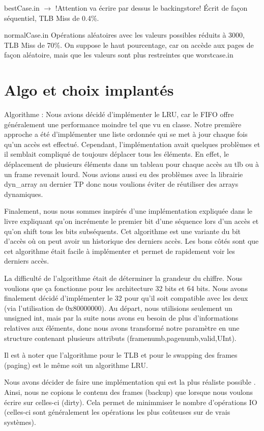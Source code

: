 \documentclass{article}
\begin{document}
bestCase.in $\rightarrow $ !Attention va écrire par dessus le backingstore!
Écrit de façon séquentiel, TLB Miss de 0.4\%.

normalCase.in
Opérations aléatoires avec les valeurs possibles réduits à 3000, TLB Miss de 70\%. On suppose le haut pourcentage, car on accède aux pages de façon aléatoire, mais que les valeurs sont plus restreintes que worstcase.in

\section{Algo et choix implantés}
\par
Algorithme : Nous avions décidé d’implémenter le LRU, car le FIFO offre généralement une performance moindre tel que vu en classe. Notre première approche a été d’implémenter une liste ordonnée qui se met à jour chaque fois qu’un accès est effectué. Cependant, l’implémentation avait quelques problèmes et il semblait compliqué de toujours déplacer tous les éléments. En effet, le déplacement de plusieurs éléments dans un tableau pour chaque accès au tlb ou à un frame revenait lourd. Nous avions aussi eu des problèmes avec la librairie dyn\_array au dernier TP donc nous voulions éviter de réutiliser des arrays dynamiques. 

Finalement, nous nous sommes inspirés d’une implémentation expliquée dans le livre expliquant qu’on incrémente le premier bit d’une séquence lors d’un accès et qu’on shift tous les bits subséquents. Cet algorithme est une variante du bit d’accès où on peut avoir un historique des derniers accès. Les bons côtés sont que cet algorithme était facile à implémenter et permet de rapidement voir les derniers accès. 

La difficulté de l’algorithme était de déterminer la grandeur du chiffre. Nous voulions que ça fonctionne pour les architecture 32 bits et 64 bits. Nous avons finalement décidé d’implémenter le 32 pour qu’il soit compatible avec les deux (via l’utilisation de 0x80000000). Au départ, nous utilisions seulement un unsigned int, mais par la suite nous avons eu besoin de plus d’informations relatives aux éléments, donc nous avons transformé notre paramètre en une structure contenant plusieurs attributs (framenumb,pagenumb,valid,UInt).

Il est à noter que l’algorithme pour le TLB et pour le swapping des frames (paging) est le même  soit un algorithme  LRU.

\par
Nous avons décider de faire une implémentation qui est la plus réaliste possible . Ainsi, nous ne copions le contenu des frames (backup) que lorsque nous voulons écrire sur celles-ci (dirty). Cela permet de minimmiser le nombre d’opérations IO (celles-ci sont généralement les opérations les plus coûteuses sur de vrais systèmes). 
\end{document}
